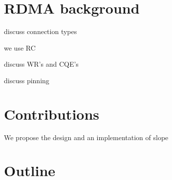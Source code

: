 \section{RDMA background}

discuss connection types

we use RC

discuss WR's and CQE's

discuss pinning

\section{Contributions}
We propose the design and an implementation of slope




\section{Outline}

